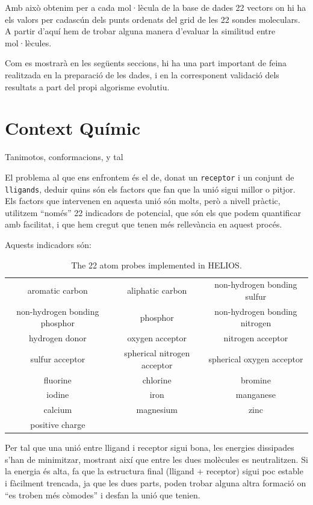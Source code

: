 \documentclass[titlepage,a4paper,12pt]{book}
\begin{document}
Amb això obtenim per a cada mol·lècula de la base de dades 22 vectors on hi ha els valors per cadascún dels punts ordenats del grid de les 22 sondes moleculars. A partir d'aquí hem de trobar alguna manera d'evaluar la similitud entre mol·lècules.

Com es mostrarà en les següents seccions, hi ha una part important de feina
realitzada en la preparació de les dades, i en la corresponent validació dels
resultats a part del propi algorisme evolutiu.


\section{Context Químic} %
\label{sec:Context Quimic}
Tanimotos, conformacions, y tal 

El problema al que ens enfrontem és el de, donat un \texttt{receptor} i un conjunt de %
\texttt{lligands}, deduir quins són els factors que fan que la unió sigui millor
o pitjor.  Els factors que intervenen en aquesta unió són molts, però a nivell
pràctic, utilitzem ``només'' 22 indicadors de potencial, que són els que podem quantificar amb
facilitat, i que hem cregut que tenen més rellevància en aquest procés.

Aquests indicadors són:

\begin{table}
\centering
\begin{tabular}{|ccc|}
\hline
aromatic carbon &aliphatic carbon&non-hydrogen bonding sulfur\\
non-hydrogen bonding phosphor&phosphor&non-hydrogen bonding nitrogen\\
hydrogen donor&oxygen acceptor&nitrogen acceptor\\
sulfur acceptor&spherical nitrogen acceptor&spherical oxygen acceptor\\
fluorine&chlorine&bromine\\
iodine&iron&manganese\\
calcium&magnesium&zinc\\
positive charge&& \\
\hline
\end{tabular}
\caption{The 22 atom probes implemented in HELIOS.}
\label{table:maps}
\end{table}

Per tal que una unió entre lligand i receptor sigui bona, les energies
dissipades s'han de minimitzar, mostrant així que entre les dues molècules es
neutralitzen.  Si la energia és alta, fa que la estructura final (lligand +
receptor) sigui poc estable i fàcilment trencada, ja que les dues parts, poden
trobar alguna altra formació on ``es troben més còmodes'' i desfan la unió que
tenien.
\end{document}
